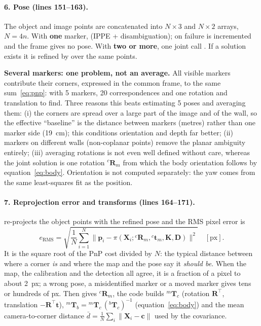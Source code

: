 \paragraph{6. Pose (lines 151--163).} The object and image points are concatenated into $N\times3$ and $N\times2$
 arrays, $N=4n$. With \textbf{one} marker,  (IPPE + disambiguation); on failure
 is incremented and the frame gives no pose. With \textbf{two or more}, one joint call
. If a solution exists it is refined by
 over the same points.

\begin{keypoint}
\textbf{Several markers: one problem, not an average.} All visible markers contribute their corners, expressed in the
common  frame, to the same sum~\eqref{eq:pnp}: with 5 markers, 20 correspondences and one rotation and
translation to find. Three reasons this beats estimating 5 poses and averaging them: (i) the corners are spread over
a large part of the image and of the wall, so the effective ``baseline'' is the distance between markers (metres)
rather than one marker side (19~cm); this conditions orientation and depth far better; (ii) markers on different
walls (non-coplanar points) remove the planar ambiguity entirely; (iii) averaging rotations is not even well defined
without care, whereas the joint solution is one rotation ${}^c\mathbf R_m$ from which the body orientation follows by
equation~\eqref{eq:body}. Orientation is not computed separately: the yaw comes from the same least-squares fit as the
position.
\end{keypoint}

\paragraph{7. Reprojection error and transforms (lines 164--171).}  re-projects the object points
with the refined pose and the RMS pixel error is
\begin{equation}
e_{\text{RMS}} = \sqrt{\frac{1}{N}\sum_{i=1}^{N}\big\lVert \mathbf p_i - \pi(\mathbf X_i;{}^c\mathbf R_m,{}^c\mathbf t_m,
\mathbf K,\mathbf D)\big\rVert^2}\quad[\text{px}] .
\label{eq:rms}
\end{equation}
It is the square root of the PnP cost divided by $N$: the typical distance between where a corner \emph{is} and where
the map and the pose say it \emph{should be}. When the map, the calibration and the detection all agree, it is a
fraction of a pixel to about 2~px; a wrong pose, a misidentified marker or a moved marker gives tens or hundreds of px.
Then  gives ${}^c\mathbf R_m$, the code builds ${}^m\mathbf T_c$ (rotation $\mathbf R^\top$, translation
$-\mathbf R^\top\mathbf t$), ${}^m\mathbf T_b = {}^m\mathbf T_c\,({}^b\mathbf T_c)^{-1}$ (equation~\eqref{eq:body}) and the
mean camera-to-corner distance
$\bar d = \frac1N\sum_i \lVert \mathbf X_i - \mathbf c\rVert$ used by the covariance.

